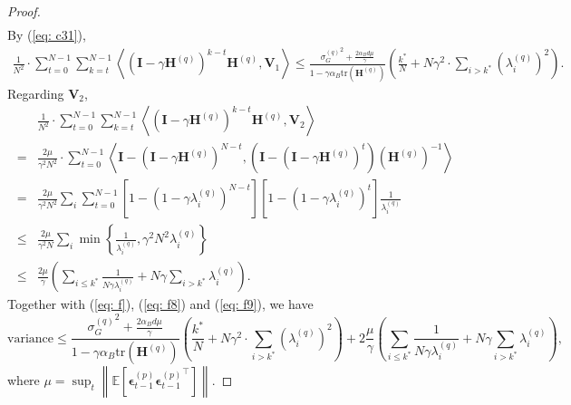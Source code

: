 \documentclass[11pt, letterpaper]{article}
\begin{document}
\begin{proof}
\begin{equation*}
\begin{aligned}
        \end{aligned}
    \end{equation*}
    By (\ref{eq: c31}),
    \begin{equation}
        \label{eq: f8}
        \begin{aligned}
            \frac{1}{N^2}\cdot\sum_{t=0}^{N-1}\sum_{k=t}^{N-1}\left\langle(\mathbf{I}-\gamma\mathbf{H}^{(q)})^{k-t}\mathbf{H}^{(q)},\mathbf{V}_1\right\rangle\leq\frac{{\sigma_G^{(q)}}^2+\frac{2\alpha_Bd\mu}{\gamma}}{1-\gamma\alpha_B\mathrm{tr}(\mathbf{H}^{(q)})}\left(\frac{k^*}{N}+N\gamma^2\cdot\sum_{i>k^*}(\lambda_i^{(q)})^2\right).
        \end{aligned}
    \end{equation}
    Regarding $\mathbf{V}_2$,
    \begin{equation}
        \label{eq: f9}
        \begin{aligned}
            &\frac{1}{N^2}\cdot\sum_{t=0}^{N-1}\sum_{k=t}^{N-1}\left\langle(\mathbf{I}-\gamma\mathbf{H}^{(q)})^{k-t}\mathbf{H}^{(q)},\mathbf{V}_2\right\rangle\\
            =&\frac{2\mu}{\gamma^2 N^2}\cdot\sum_{t=0}^{N-1}\left\langle\mathbf{I}-(\mathbf{I}-\gamma\mathbf{H}^{(q)})^{N-t},\left(\mathbf{I}-(\mathbf{I}-\gamma\mathbf{H}^{(q)})^t\right)(\mathbf{H}^{(q)})^{-1}\right\rangle\\
            =&\frac{2\mu}{\gamma^2 N^2}\sum_i\sum_{t=0}^{N-1}\left[1-(1-\gamma\lambda_i^{(q)})^{N-t}\right]\left[1-(1-\gamma\lambda_i^{(q)})^t\right]\frac{1}{\lambda_i^{(q)}}\\
            \leq &\frac{2\mu}{\gamma^2 N}\sum_i \min\left\{\frac{1}{\lambda_i^{(q)}},\gamma^2 N^2\lambda_i^{(q)}\right\}\\
            \leq&\frac{2\mu}{\gamma}\left(\sum_{i\leq k^*}\frac{1}{N\gamma\lambda_i^{(q)}}+N\gamma\sum_{i>k^*}\lambda_i^{(q)}\right).
        \end{aligned}
    \end{equation}
    Together with (\ref{eq: f}), (\ref{eq: f8}) and (\ref{eq: f9}), we have
    \begin{equation*}
        \mathrm{variance}\leq \frac{{\sigma_G^{(q)}}^2+\frac{2\alpha_Bd\mu}{\gamma}}{1-\gamma\alpha_B\mathrm{tr}(\mathbf{H}^{(q)})}\left(\frac{k^*}{N}+N\gamma^2\cdot\sum_{i>k^*}(\lambda_i^{(q)})^2\right)+2\frac{\mu}{\gamma}\left(\sum_{i\leq k^*}\frac{1}{N\gamma\lambda_i^{(q)}}+N\gamma\sum_{i>k^*}\lambda_i^{(q)}\right),
    \end{equation*}
    where $\mu=\sup_t\left\|\mathbb{E}\left[\boldsymbol{\epsilon}_{t-1}^{(p)}{\boldsymbol{\epsilon}_{t-1}^{(p)}}^\top\right]\right\|$.
\end{proof}
\end{document}
